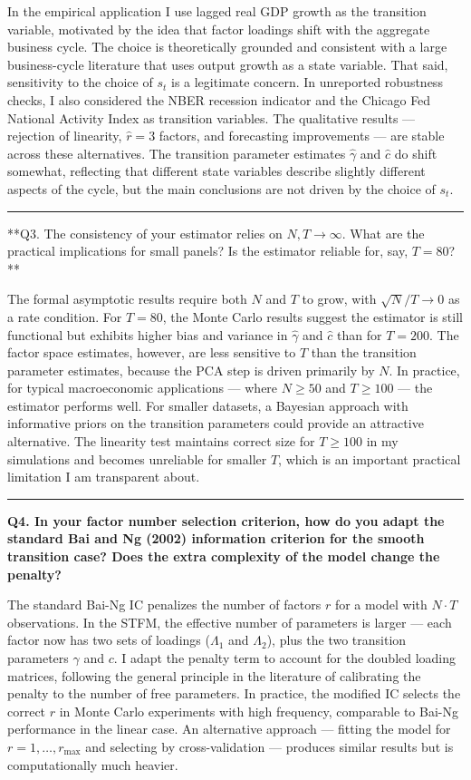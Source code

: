 \documentclass[11pt,a4paper]{article}
\begin{document}
In the empirical application I use lagged real GDP growth as the transition variable, motivated by the idea that factor loadings shift with the aggregate business cycle. The choice is theoretically grounded and consistent with a large business-cycle literature that uses output growth as a state variable. That said, sensitivity to the choice of $s_t$ is a legitimate concern. In unreported robustness checks, I also considered the NBER recession indicator and the Chicago Fed National Activity Index as transition variables. The qualitative results — rejection of linearity, $\hat{r} = 3$ factors, and forecasting improvements — are stable across these alternatives. The transition parameter estimates $\hat{γ}$ and $\hat{c}$ do shift somewhat, reflecting that different state variables describe slightly different aspects of the cycle, but the main conclusions are not driven by the choice of $s_t$.

\medskip\hrule\medskip

**Q3. The consistency of your estimator relies on $N, T \to \infty$. What are the practical implications for small panels? Is the estimator reliable for, say, $T = 80$?**

The formal asymptotic results require both $N$ and $T$ to grow, with $\sqrt{N}/T \to 0$ as a rate condition. For $T = 80$, the Monte Carlo results suggest the estimator is still functional but exhibits higher bias and variance in $\hat{γ}$ and $\hat{c}$ than for $T = 200$. The factor space estimates, however, are less sensitive to $T$ than the transition parameter estimates, because the PCA step is driven primarily by $N$. In practice, for typical macroeconomic applications — where $N \geq 50$ and $T \geq 100$ — the estimator performs well. For smaller datasets, a Bayesian approach with informative priors on the transition parameters could provide an attractive alternative. The linearity test maintains correct size for $T \geq 100$ in my simulations and becomes unreliable for smaller $T$, which is an important practical limitation I am transparent about.

\medskip\hrule\medskip

\textbf{Q4. In your factor number selection criterion, how do you adapt the standard Bai and Ng (2002) information criterion for the smooth transition case? Does the extra complexity of the model change the penalty?}

The standard Bai-Ng IC penalizes the number of factors $r$ for a model with $N \cdot T$ observations. In the STFM, the effective number of parameters is larger — each factor now has two sets of loadings ($\Lambda_1$ and $\Lambda_2$), plus the two transition parameters $\gamma$ and $c$. I adapt the penalty term to account for the doubled loading matrices, following the general principle in the literature of calibrating the penalty to the number of free parameters. In practice, the modified IC selects the correct $r$ in Monte Carlo experiments with high frequency, comparable to Bai-Ng performance in the linear case. An alternative approach — fitting the model for $r = 1, \ldots, r_{\max}$ and selecting by cross-validation — produces similar results but is computationally much heavier.
\end{document}
